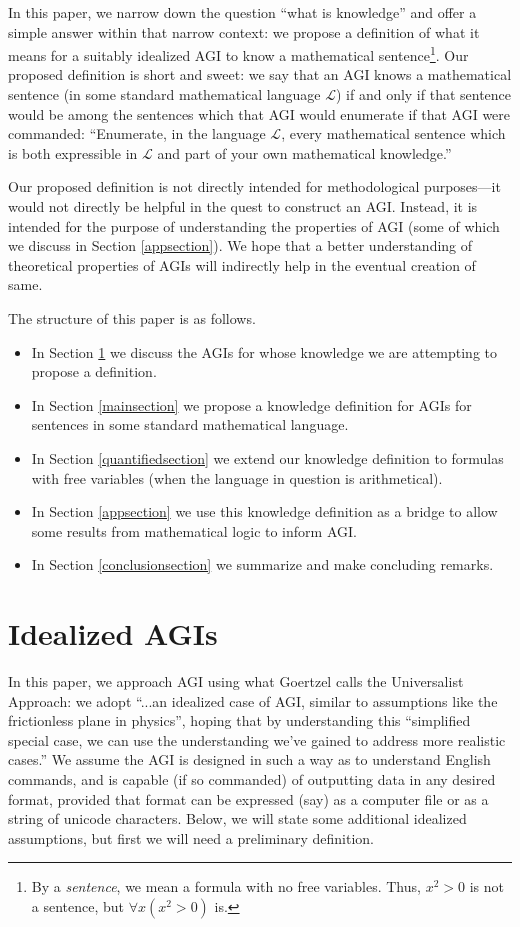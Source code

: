 \documentclass[runningheads]{llncs}
\begin{document}
In this paper, we narrow down the question ``what is knowledge'' and offer
a simple answer within that narrow context:
we propose a definition of what it means for a suitably idealized AGI to know
a mathematical sentence\footnote{By a \emph{sentence}, we mean a formula with
no free variables. Thus, $x^2>0$ is not a sentence, but
$\forall x (x^2>0)$ is.}. Our proposed definition is short and
sweet: we say that
an AGI knows a mathematical sentence (in some standard mathematical language $\mathscr L$)
if and only if that sentence would be among the sentences which that AGI would
enumerate if that AGI were commanded:
``Enumerate, in the language $\mathscr L$, every mathematical sentence which
is both expressible in $\mathscr L$ and part of your own mathematical knowledge.''

Our proposed definition is not directly intended
for methodological purposes---it would not
directly be helpful in the quest to construct an AGI. Instead, it is intended for
the purpose of understanding the properties of AGI (some of which
we discuss in Section \ref{appsection}). We hope that a better
understanding of theoretical properties of AGIs will indirectly help in the eventual
creation of same.

The structure of this paper is as follows.
\begin{itemize}
  \item In Section \ref{agisection} we discuss the AGIs for whose knowledge we are
  attempting to propose a definition.
  \item In Section \ref{mainsection} we propose a knowledge definition for
  AGIs for sentences in some standard mathematical language.
  \item In Section \ref{quantifiedsection} we extend our knowledge definition
  to formulas with free variables (when the
  language in question is arithmetical).
  \item In Section \ref{appsection} we use this knowledge definition as a bridge
  to allow some results from mathematical logic to inform AGI.
  \item In Section \ref{conclusionsection} we summarize and make concluding remarks.
\end{itemize}

\section{Idealized AGIs}
\label{agisection}



In this paper, we approach AGI using what
Goertzel \cite{goertzel2014artificial} calls
the Universalist Approach:
we adopt ``...an idealized case of AGI, similar to
assumptions like the frictionless plane in physics'', hoping that by
understanding this ``simplified special
case, we can use the understanding we've gained to address more realistic
cases.'' We assume the AGI is designed in such a way as to understand
English commands, and is capable (if so commanded) of outputting data in
any desired format, provided that format can be expressed (say) as a computer
file or as a string of unicode characters. Below, we will state some additional
idealized assumptions, but first we will need a preliminary definition.
\end{document}
